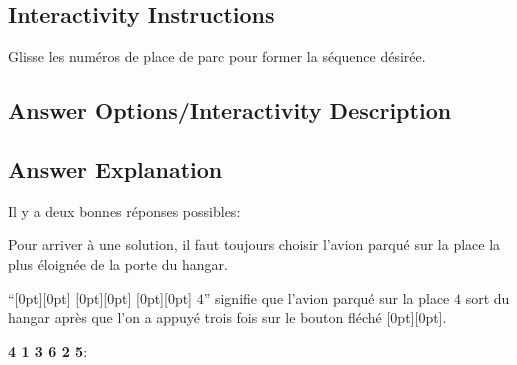 \documentclass[a4paper,11pt]{report}
\newcommand{\taskGraphicsFolder}{..}
\begin{document}
\subsection*{Interactivity Instructions}

Glisse les numéros de place de parc pour former la séquence désirée.

{\centering%
\par}

\begingroup
\renewcommand{\arraystretch}{1.5}
\subsection*{Answer Options/Interactivity Description}



\endgroup

\subsection*{Answer Explanation}

Il y a deux bonnes réponses possibles:

{\centering%
\par}

{\centering%
\par}

Pour arriver à une solution, il faut toujours choisir l’avion parqué sur la place la plus éloignée de la porte du hangar.

“\raisebox{-0.5ex}[0pt][0pt]{} \raisebox{-0.5ex}[0pt][0pt]{} \raisebox{-0.5ex}[0pt][0pt]{}  $4$” signifie que l’avion parqué sur la place $4$ sort du hangar après que l’on a appuyé trois fois sur le bouton fléché \raisebox{-0.5ex}[0pt][0pt]{}.

\textbf{4 1 3 6 2 5}:

{\centering%
\par}
\end{document}
